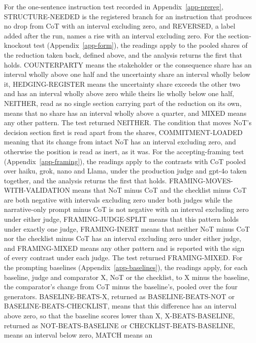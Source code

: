 For the one-sentence instruction test recorded in Appendix~\ref{app-prereg},
STRUCTURE-NEEDED is the registered branch for an instruction that produces no
drop from CoT with an interval excluding zero, and REVERSED, a label added
after the run, names a rise with an interval excluding zero.
For the section-knockout test (Appendix~\ref{app-form}), the readings apply
to the pooled shares of the reduction taken back, defined above, and the
analysis returns the first that holds. COUNTERPARTY means the stakeholder or
the consequence share has an interval wholly above one half and the
uncertainty share an interval wholly below it, HEDGING-REGISTER means the
uncertainty share exceeds the other two and has an interval wholly above zero
while theirs lie wholly below one half, NEITHER, read as no single section
carrying part of the reduction on its own, means that no share has an
interval wholly above a quarter, and MIXED means any other pattern. The test
returned NEITHER. The condition that moves NoT's decision section first is
read apart from the shares, COMMITMENT-LOADED meaning that its change from
intact NoT has an interval excluding zero, and otherwise the position is read
as inert, as it was.
For the accepting-framing test (Appendix~\ref{app-framing}), the readings
apply to the contrasts with CoT pooled over haiku, grok, nano and Llama,
under the production judge and gpt-4o taken together, and the analysis
returns the first that holds. FRAMING-MOVES-WITH-VALIDATION means that NoT
minus CoT and the checklist minus CoT are both negative with intervals
excluding zero under both judges while the narrative-only prompt minus CoT
is not negative with an interval excluding zero under either judge,
FRAMING-JUDGE-SPLIT means that this pattern holds under exactly one judge,
FRAMING-INERT means that neither NoT minus CoT nor the checklist minus CoT
has an interval excluding zero under either judge, and FRAMING-MIXED means
any other pattern and is reported with the sign of every contrast under each
judge. The test returned FRAMING-MIXED.
For the prompting baselines (Appendix~\ref{app-baselines}), the readings
apply, for each baseline, judge and comparator X, NoT or the checklist, to X
minus the baseline, the comparator's change from CoT minus the baseline's,
pooled over the four generators. BASELINE-BEATS-X, returned as
BASELINE-BEATS-NOT or BASELINE-BEATS-CHECKLIST, means that this difference
has an interval above zero, so that the baseline scores lower than X,
X-BEATS-BASELINE, returned as NOT-BEATS-BASELINE or
CHECKLIST-BEATS-BASELINE, means an interval below zero, MATCH means an
